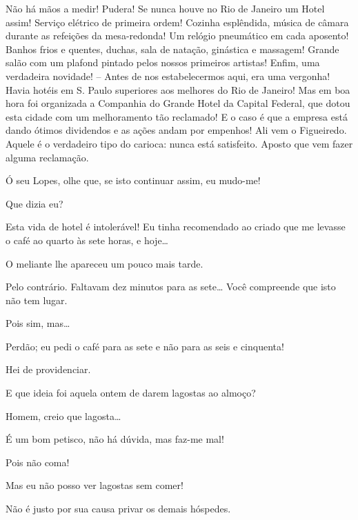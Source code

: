   Não há mãos a medir! Pudera! Se nunca houve no Rio de
Janeiro um Hotel assim! Serviço elétrico de primeira ordem! Cozinha
esplêndida, música de câmara durante as refeições da mesa-redonda! Um relógio
pneumático em cada aposento! Banhos frios e quentes, duchas, sala de natação,
ginástica e massagem! Grande salão com um plafond pintado pelos nossos primeiros
artistas! Enfim, uma verdadeira novidade! -- Antes de nos estabelecermos aqui, era uma
vergonha! Havia hotéis em S. Paulo superiores aos melhores do Rio de
Janeiro! Mas em boa hora foi organizada a Companhia do Grande Hotel da Capital Federal,
que dotou esta cidade com um melhoramento tão reclamado! E o caso é que a
empresa está dando ótimos dividendos e as ações andam por empenhos!  Ali vem o Figueiredo. Aquele
é o verdadeiro tipo do carioca: nunca está satisfeito. Aposto que vem fazer
alguma reclamação.


 Ó seu Lopes, olhe que, se isto continuar assim, eu mudo-me!

  Que dizia eu?

 Esta vida de hotel é intolerável! Eu tinha recomendado ao
criado que me levasse o café ao quarto às sete horas, e hoje\ldots{}

 O meliante lhe apareceu um pouco mais tarde.

 Pelo contrário. Faltavam dez minutos para as sete\ldots{} Você
compreende que isto não tem lugar.

 Pois sim, mas\ldots{}

 Perdão; eu pedi o café para as sete e não para as seis e
cinquenta!

 Hei de providenciar.

 E que ideia foi aquela ontem de darem lagostas ao almoço?

 Homem, creio que lagosta\ldots{}

 É um bom petisco, não há dúvida, mas faz-me mal!

 Pois não coma!

 Mas eu não posso ver lagostas sem comer!

 Não é justo por sua causa privar os demais hóspedes.

